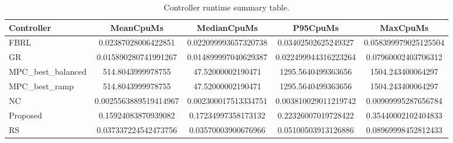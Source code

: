 \begin{table}[t]
\centering
\caption{Controller runtime summary table.}
\label{tab:runtime_auto}
\begin{tabular}{lcccc}
\toprule
Controller & MeanCpuMs & MedianCpuMs & P95CpuMs & MaxCpuMs \\
\midrule
FBRL & 0.02387028006422851 & 0.022099993657320738 & 0.03402502625249327 & 0.058399979025125504 \\
GR & 0.015890280741991267 & 0.014899997040629387 & 0.022499944316223264 & 0.07960002403706312 \\
MPC\_best\_balanced & 514.8043999978755 & 47.52000002190471 & 1295.5640499363656 & 1504.243400064297 \\
MPC\_best\_ramp & 514.8043999978755 & 47.52000002190471 & 1295.5640499363656 & 1504.243400064297 \\
NC & 0.0025563889519414967 & 0.002300017513334751 & 0.003810029011219742 & 0.00909995287656784 \\
Proposed & 0.15924083870939082 & 0.17234997358173132 & 0.22326007019728422 & 0.35440002102404833 \\
RS & 0.037337224542473756 & 0.03570003900676966 & 0.05100503913126886 & 0.08969998452812433 \\
\bottomrule
\end{tabular}
\end{table}